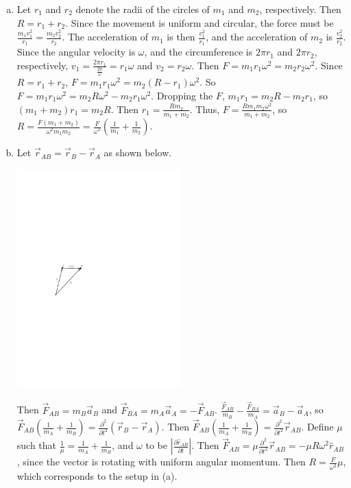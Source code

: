 \documentclass{esg8012pset}
\begin{document}
\begin{solution}
  \begin{enumerate}[a)]
    \item Let $r_1$ and $r_2$ denote the radii of the circles of $m_1$ and $m_2$, respectively.  Then $R = r_1 + r_2$.  Since the movement is uniform and circular, the force must be $\frac{m_1 v_1^2}{r_1} = \frac{m_2 v_2^2}{r_2}$.  The acceleration of $m_1$ is then $\frac{v_1^2}{r_1}$, and the acceleration of $m_2$ is $\frac{v_2^2}{r_2}$.  Since the angular velocity is $\omega$, and the circumference is $2\pi r_1$ and $2\pi r_2$, respectively, $v_1 = \frac{2\pi r_1}{\frac{2\pi}{\omega}} = r_1 \omega$ and $v_2 = r_2 \omega$.  Then $F = m_1 r_1 \omega^2 =  m_2 r_2 \omega^2$.  Since $R = r_1 + r_2$, $F = m_1 r_1 \omega^2 = m_2 (R - r_1) \omega^2$.  So $F = m_1 r_1 \omega^2 = m_2 R \omega^2 - m_2 r_1 \omega^2$.  Dropping the $F$, $m_1 r_1 = m_2 R - m_2 r_1$, so $(m_1 + m_2)r_1 = m_2 R$.  Then $r_1 = \frac{R m_2}{m_1 + m_2}$.  Thus, $F =  \frac{R m_1 m_2\omega^2}{m_1 + m_2}$, so $R = \frac{F(m_1+m_2)}{\omega^2 m_1 m_2} = \frac{F}{\omega^2}\left(\frac{1}{m_1}+\frac{1}{m_2}\right)$.
    \item Let $\vec r_{AB} = \vec r_B - \vec r_A$ as shown below. \begin{center}\includegraphics[width=0.5\textwidth]{2009-09-25_Diagram_10}\end{center}  Then $\vec F_{AB} = m_B \vec a_B$ and $\vec F_{BA} = m_A \vec a_A = -\vec F_{AB}$.  $\frac{\vec F_{AB}}{m_B} - \frac{\vec F_{BA}}{m_A} = \vec a_B - \vec a_A$, so $\vec F_{AB}\left(\frac{1}{m_A} + \frac{1}{m_B}\right) = \frac{\partial^2}{\partial t^2}(\vec r_B - \vec r_A)$.  Then $\vec F_{AB}\left(\frac{1}{m_A} + \frac{1}{m_B}\right) = \frac{\partial^2}{\partial t^2}\vec r_{AB}$.  Define $\mu$ such that $\frac{1}{\mu} = \frac{1}{m_A} + \frac{1}{m_B}$, and $\omega$ to be $\left\vert \frac{\partial \hat r_{AB}}{\partial t}\right\vert$.  Then $\vec F_{AB} = \mu \frac{\partial^2}{\partial t^2}\vec r_{AB} = -\mu R\omega^2\hat r_{AB}$, since the vector is rotating with uniform angular momentum.  Then $R = \frac{F}{\omega^2}\mu$, which corresponds to the setup in (a).
  \end{enumerate}
\end{solution}
\end{document}
